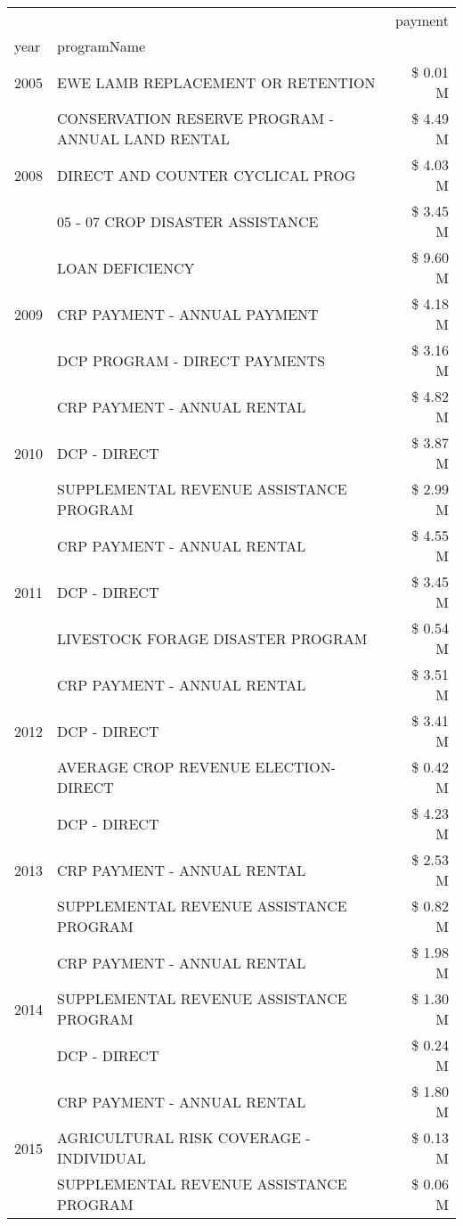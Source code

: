 \begin{tabular}{llr}
\toprule
 &  & payment \\
year & programName &  \\
\midrule
2005 & EWE LAMB REPLACEMENT OR RETENTION & \$ 0.01 M \\
\cline{1-3}
\multirow[t]{3}{*}{2008} & CONSERVATION RESERVE PROGRAM - ANNUAL LAND RENTAL & \$ 4.49 M \\
 & DIRECT AND COUNTER CYCLICAL PROG & \$ 4.03 M \\
 & 05 - 07 CROP DISASTER ASSISTANCE & \$ 3.45 M \\
\cline{1-3}
\multirow[t]{3}{*}{2009} & LOAN DEFICIENCY & \$ 9.60 M \\
 & CRP PAYMENT - ANNUAL PAYMENT & \$ 4.18 M \\
 & DCP PROGRAM - DIRECT PAYMENTS & \$ 3.16 M \\
\cline{1-3}
\multirow[t]{3}{*}{2010} & CRP PAYMENT - ANNUAL RENTAL & \$ 4.82 M \\
 & DCP - DIRECT & \$ 3.87 M \\
 & SUPPLEMENTAL REVENUE ASSISTANCE PROGRAM & \$ 2.99 M \\
\cline{1-3}
\multirow[t]{3}{*}{2011} & CRP PAYMENT - ANNUAL RENTAL & \$ 4.55 M \\
 & DCP - DIRECT & \$ 3.45 M \\
 & LIVESTOCK FORAGE DISASTER PROGRAM & \$ 0.54 M \\
\cline{1-3}
\multirow[t]{3}{*}{2012} & CRP PAYMENT - ANNUAL RENTAL & \$ 3.51 M \\
 & DCP - DIRECT & \$ 3.41 M \\
 & AVERAGE CROP REVENUE ELECTION-DIRECT & \$ 0.42 M \\
\cline{1-3}
\multirow[t]{3}{*}{2013} & DCP - DIRECT & \$ 4.23 M \\
 & CRP PAYMENT - ANNUAL RENTAL & \$ 2.53 M \\
 & SUPPLEMENTAL REVENUE ASSISTANCE PROGRAM & \$ 0.82 M \\
\cline{1-3}
\multirow[t]{3}{*}{2014} & CRP PAYMENT - ANNUAL RENTAL & \$ 1.98 M \\
 & SUPPLEMENTAL REVENUE ASSISTANCE PROGRAM & \$ 1.30 M \\
 & DCP - DIRECT & \$ 0.24 M \\
\cline{1-3}
\multirow[t]{3}{*}{2015} & CRP PAYMENT - ANNUAL RENTAL & \$ 1.80 M \\
 & AGRICULTURAL RISK COVERAGE - INDIVIDUAL & \$ 0.13 M \\
 & SUPPLEMENTAL REVENUE ASSISTANCE PROGRAM & \$ 0.06 M \\

\end{tabular}
